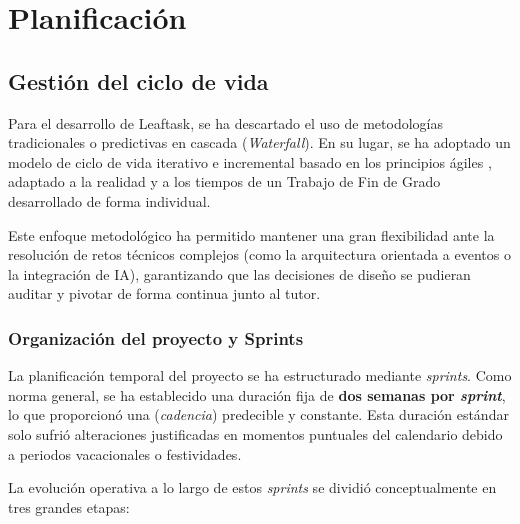 \chapter{Planificación}
\label{chap:planificacion}

\section{Gestión del ciclo de vida}
Para el desarrollo de Leaftask, se ha descartado el uso de metodologías tradicionales o predictivas en cascada (\emph{Waterfall}). En su lugar, se ha adoptado un modelo de ciclo de vida iterativo e incremental basado en los principios ágiles \cite{beck2001agile}, adaptado a la realidad y a los tiempos de un Trabajo de Fin de Grado desarrollado de forma individual.

Este enfoque metodológico ha permitido mantener una gran flexibilidad ante la resolución de retos técnicos complejos (como la arquitectura orientada a eventos o la integración de \ac{IA}), garantizando que las decisiones de diseño se pudieran auditar y pivotar de forma continua junto al tutor.

\subsection{Organización del proyecto y Sprints}
La planificación temporal del proyecto se ha estructurado mediante \emph{sprints}. Como norma general, se ha establecido una duración fija de \textbf{dos semanas por \emph{sprint}}, lo que proporcionó una (\emph{cadencia}) predecible y constante. Esta duración estándar solo sufrió alteraciones justificadas en momentos puntuales del calendario debido a periodos vacacionales o festividades.

La evolución operativa a lo largo de estos \emph{sprints} se dividió conceptualmente en tres grandes etapas:

